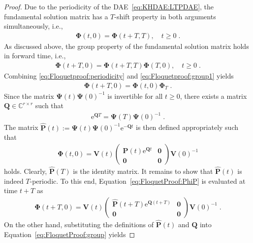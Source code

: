 \documentclass[a4paper, nonatbib, 3p, twocolumn]{elsarticle}
\theoremstyle{plain}
\theoremstyle{definition}
\theoremstyle{remark}
\newcommand{\mo}{\vPh_T}
\newcommand{\ex}{\re} %
\newcommand{\vzero}{\mathbf{0}}
\newcommand{\Cspace}{\mathbb{C}}
\newcommand{\re}{\mathrm e}
\newcommand{\vPh}{\mathbf \Phi}
\newcommand{\vPs}{\mathbf \Psi}
\newcommand{\vP}{\mathbf P}
\newcommand{\vQ}{\mathbf Q}
\newcommand{\vV}{\mathbf V}
\begin{document}
\begin{proof}
    Due to the periodicity of the DAE~\eqref{eq:KHDAE:LTPDAE}, the fundamental solution matrix has a $T$-shift property in both arguments simultaneously, i.e., 
    \begin{align}\label{eq:Floquetproof:periodicity}
        \vPh(t, 0) = \vPh(t+T, T), \quad t \geq 0 \;.
    \end{align}
    As discussed above, the group property of the fundamental solution matrix holds in forward time, i.e., 
    \begin{align}\label{eq:Floquetproof:group1}
        \vPh(t + T, 0) = \vPh(t + T, T) \vPh(T, 0), \quad t \geq 0 \;.
    \end{align}
    Combining \eqref{eq:Floquetproof:periodicity} and \eqref{eq:Floquetproof:group1} yields
    \begin{align}\label{eq:FloquetProof:group}
        \vPh(t + T, 0) =  \vPh(t, 0) \mo \;.
    \end{align} 
    Since the matrix $\vPs(t) \vPs(0)^{-1}$ is invertible for all $t \geq 0$, there exists a matrix $\vQ \in \Cspace^{r \times r}$ such that 
    \begin{align}\label{eq:FloquetProof:matrixlog}
        \ex^{\vQ T} = \vPs(T) \vPs(0)^{-1}\;.
    \end{align}
The matrix $\hat{\vP}(t) := \vPs(t) \vPs(0)^{-1} \ex^{-\vQ t}$ is then defined appropriately such that
    \begin{align}\label{eq:FloquetProof:PhiP}
        \vPh(t,0) = \vV(t) \begin{pmatrix}
            \hat{\vP}(t) \ex^{\vQ t} & \vzero\\ \vzero & \vzero
        \end{pmatrix} \vV(0)^{-1}
    \end{align}
    holds. Clearly, $\hat{\vP}(T)$ is the identity matrix. It remains to show that $\hat{\vP}(t)$ is indeed $T$-periodic. To this end, Equation~\eqref{eq:FloquetProof:PhiP} is evaluated at time $t+T$ as
    \begin{align}\label{eq:FloquetProof:PhitplusT}
        \vPh(t + T,0) = \vV(t) \begin{pmatrix}
            \hat{\vP}(t + T) \ex^{\vQ (t+T)}& \vzero\\ \vzero & \vzero
        \end{pmatrix} \vV(0)^{-1}\;.
    \end{align}
    On the other hand, substituting the definitions of $\hat{\vP}(t)$ and $\vQ$ into Equation~\eqref{eq:FloquetProof:group} yields

\end{proof}
\end{document}
